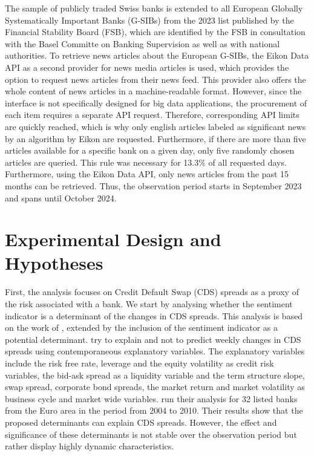 The sample of publicly traded Swiss banks is extended to all European Globally Systematically Important Banks (G-SIBs) from the 2023 list published by the Financial Stability Board (FSB), which are identified by the FSB in consultation with the Basel Committe on Banking Supervision as well as with national authorities. To retrieve news articles about the European G-SIBs, the Eikon Data API as a second provider for news media articles is used, which provides the option to request news articles from their news feed. This provider also offers the whole content of news articles in a machine-readable format. However, since the interface is not specifically designed for big data applications, the procurement of each item requires a separate API request. Therefore, corresponding API limits are quickly reached, which is why only english articles labeled as significant news by an algorithm by Eikon are requested. Furthermore, if there are more than five articles available for a specific bank on a given day, only five randomly chosen articles are queried. This rule was necessary for 13.3\% of all requested days. Furthermore, using the Eikon Data API, only news articles from the past 15 months can be retrieved. Thus, the observation period starts in September 2023 and spans until October 2024.

\section{Experimental Design and Hypotheses} \label{sec:hypotheses}

First, the analysis focuses on Credit Default Swap (CDS) spreads as a proxy of the risk associated with a bank. We start by analysing whether the sentiment indicator is a determinant of the changes in CDS spreads. This analysis is based on the work of \cite{annaert2013}, extended by the inclusion of the sentiment indicator as a potential determinant. \cite{annaert2013} try to explain and not to predict weekly changes in CDS spreads using contemporaneous explanatory variables. The explanatory variables include the risk free rate, leverage and the equity volatility as credit risk variables, the bid-ask spread as a liquidity variable and the term structure slope, swap spread, corporate bond spreads, the market return and market volatility as business cycle and market wide variables. %
\cite{annaert2013} run their analysis for 32 listed banks from the Euro area in the period from 2004 to 2010. Their results show that the proposed determinants can explain CDS spreads. However, the effect and significance of these determinants is not stable over the observation period but rather display highly dynamic characteristics. \\		

